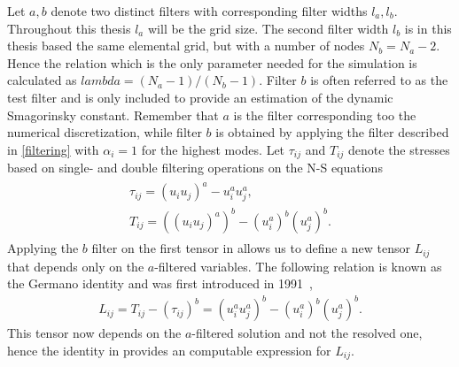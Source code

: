 Let $a,b$ denote two distinct filters with corresponding filter widths $l_a,l_b$. 
Throughout this thesis $l_a$ will be the grid size. The second filter width $l_b$ 
is in this thesis based the same elemental grid, but with a number of nodes $N_b = N_a - 2$.
Hence the relation which is the only parameter needed for the simulation is calculated as $lambda = (N_a-1)/(N_b-1)$.
Filter $b$ is often referred to as the test filter and is only included to provide an estimation 
of the dynamic Smagorinsky constant. Remember that $a$ is the filter corresponding too the numerical discretization, while 
filter $b$ is obtained by applying the filter described in \cref{filtering} with $\alpha_i=1$ for the highest modes.
Let $\tau_{ij}$ and $T_{ij}$ denote the stresses based on single- and double filtering
operations on the N-S equations
\begin{align}
    \begin{split}
    \tau_{ij} = (u_iu_j)^a - u_i^au_j^a,\\
    T_{ij} = ((u_iu_j)^a)^b - (u_i^a)^b(u_j^a)^b.
    \end{split}
    \label{eq:stresstensors}
\end{align}
Applying the $b$ filter on the first tensor in  allows us to define 
a new tensor $L_{ij}$ that depends only on the $a$-filtered variables. The following relation
is known as the Germano identity and was first introduced in 1991~\cite{Germano91},
\begin{align}
    L_{ij} = T_{ij} - (\tau_{ij})^b
    = (u_i^au_j^a)^b - (u_i^a)^b(u_j^a)^b.
    \label{eq:germanoid}
\end{align}
This tensor now depends on the $a$-filtered solution and not the resolved 
one, hence the identity in  provides an computable expression for $L_{ij}$.

